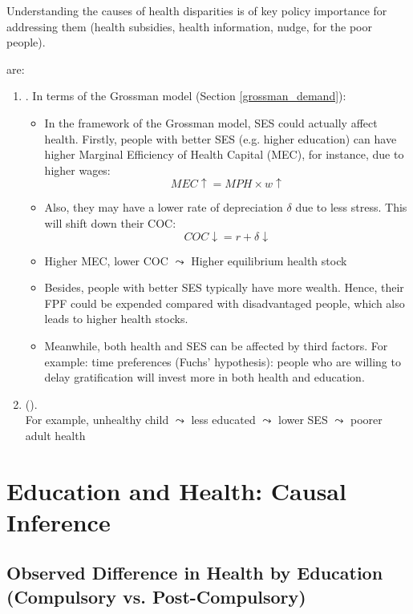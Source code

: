         Understanding the causes of health disparities is of key policy importance for addressing them (health subsidies, health information, nudge, for the poor people).
        
         are:
        \begin{enumerate}
            \item {}. In terms of the Grossman model (Section \ref{grossman_demand}):
            \begin{itemize}
                \item In the framework of the Grossman model, SES could actually affect health.
                Firstly, people with better SES (e.g. higher education) can have higher Marginal Efficiency of Health Capital (MEC), for instance, due to higher wages:
                $$MEC\uparrow=MPH\times w\uparrow$$
                \item Also, they may have a lower rate of depreciation $\delta$ due to less stress. This will shift down their COC:
                $$COC\downarrow=r+\delta \downarrow$$
                \item Higher MEC, lower COC $\leadsto$ Higher equilibrium health stock
                \item Besides, people with better SES typically have more wealth. Hence, their FPF could be expended compared with disadvantaged people, which also leads to higher health stocks.
                \item Meanwhile, both health and SES can be affected by third factors. For example: time preferences (Fuchs’ hypothesis): people who are willing to delay gratification will invest more in both health and education.
            \end{itemize}
            \item {} ().\\
            For example, unhealthy child $\leadsto$ less educated $\leadsto$ lower SES $\leadsto$ poorer adult health
        \end{enumerate}

\section{Education and Health: Causal Inference}

    \subsection{Observed Difference in Health by Education (Compulsory vs. Post-Compulsory)}
    
